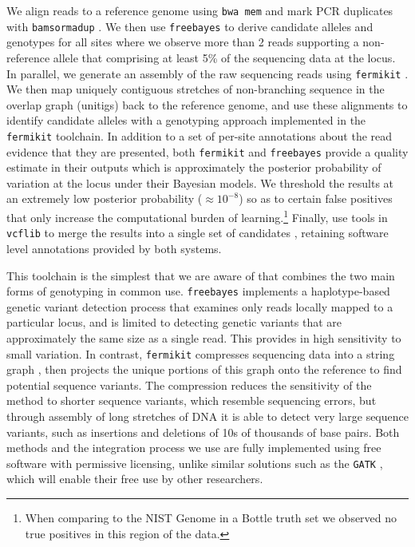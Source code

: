 \documentclass{article}
\begin{document}
We align reads to a reference genome using {\tt bwa mem} \cite{li2013bwamem} and mark PCR duplicates with {\tt bamsormadup} \cite{tischler2014biobambam}.
We then use {\tt freebayes} \cite{garrison2012haplotype} to derive candidate alleles and genotypes for all sites where we observe more than 2 reads supporting a non-reference allele that comprising at least 5\% of the sequencing data at the locus.
In parallel, we generate an assembly of the raw sequencing reads using {\tt fermikit} \cite{li2015fermikit}.
We then map uniquely contiguous stretches of non-branching sequence in the overlap graph (unitigs) back to the reference genome, and use these alignments to identify candidate alleles with a genotyping approach implemented in the {\tt fermikit} toolchain.
In addition to a set of per-site annotations about the read evidence that they are presented, both {\tt fermikit} and {\tt freebayes} provide a quality estimate in their outputs which is approximately the posterior probability of variation at the locus under their Bayesian models.
We threshold the results at an extremely low posterior probability ($\approx 10^{-8}$) so as to certain false positives that only increase the computational burden of learning.\footnote{When comparing to the NIST Genome in a Bottle truth set we observed no true positives in this region of the data.}
Finally, use tools in {\tt vcflib} to merge the results into a single set of candidates \cite{vcflibgit}, retaining software level annotations provided by both systems.

This toolchain is the simplest that we are aware of that combines the two main forms of genotyping in common use.
{\tt freebayes} implements a haplotype-based genetic variant detection process that examines only reads locally mapped to a particular locus, and is limited to detecting genetic variants that are approximately the same size as a single read.
This provides in high sensitivity to small variation.
In contrast, {\tt fermikit} compresses sequencing data into a string graph \cite{myers2005}, then projects the unique portions of this graph onto the reference to find potential sequence variants.
The compression reduces the sensitivity of the method to shorter sequence variants, which resemble sequencing errors, but through assembly of long stretches of DNA it is able to detect very large sequence variants, such as insertions and deletions of 10s of thousands of base pairs.
Both methods and the integration process we use are fully implemented using free software with permissive licensing, unlike similar solutions such as the {\tt GATK} \cite{gatk2011}, which will enable their free use by other researchers.
\end{document}
